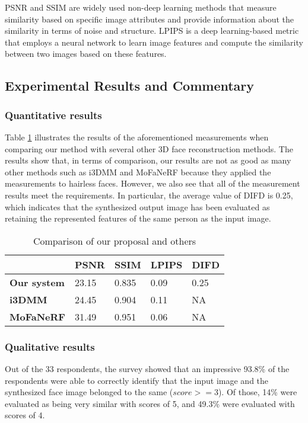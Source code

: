 PSNR and SSIM are widely used non-deep learning methods that measure similarity based on specific image attributes and provide information about the similarity in terms of noise and structure.
LPIPS is a deep learning-based metric that employs a neural network to learn image features and compute the similarity between two images based on these features.

\subsection{Experimental Results and Commentary}
\subsubsection{Quantitative results}
Table \ref{loss_stats} illustrates the results of the aforementioned measurements when comparing our method with several other 3D face reconstruction methods. The results show that, in terms of comparison, our results are not as good as many other methods such as i3DMM and MoFaNeRF because they applied the measurements to hairless faces. However, we also see that all of the measurement results meet the requirements. In particular, the average value of DIFD is 0.25, which indicates that the synthesized output image has been evaluated as retaining the represented features of the same person as the input image.

\begin{table}[htbp]
    \centering
    \caption{Comparison of our proposal and others}
    \begin{tabularx}{\linewidth}{| X | X | X | X | X |}
    \hline
               & \textbf{PSNR} & \textbf{SSIM} & \textbf{LPIPS} & \textbf{DIFD} \\ \hline\hline
    \textbf{Our system} &  23.15  &   0.835   &   0.09    &   0.25   \\ \hline %
    \textbf{i3DMM}   &   24.45   &   0.904   &    0.11   &    NA  \\ \hline
    \textbf{MoFaNeRF}   &   31.49   &  0.951    &   0.06    &   NA   \\ \hline
    \end{tabularx}
    \label{loss_stats}
\end{table}

\subsubsection{Qualitative results}
Out of the 33 respondents, the survey showed that an impressive 93.8\% of the respondents were able to correctly identify that the input image and the synthesized face image belonged to the same  ($score >= 3$). Of those, 14\% were evaluated as being very similar with scores of 5, and 49.3\% were evaluated with scores of 4. %

